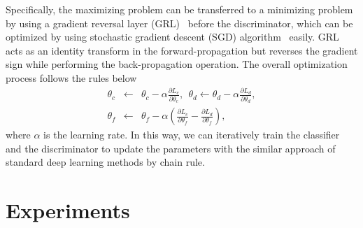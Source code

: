\documentclass[journal]{IEEEtran}
\begin{document}
Specifically, the maximizing problem can be transferred to a minimizing problem by using a gradient reversal layer (GRL)~\cite{ganin2016domain} before the discriminator, which can be optimized by using stochastic gradient
descent (SGD) algorithm~\cite{bottou2010large} easily. GRL acts as an identity transform in the forward-propagation but reverses the gradient sign while performing the back-propagation operation. The overall optimization process follows the rules below
\begin{eqnarray}
\theta_c \!\!\!\!&\leftarrow&\!\!\!\! \theta_c - \alpha \frac{\partial{L_c}}{\partial{\theta_c}},~~
\theta_d \leftarrow \theta_d - \alpha \frac{\partial{L_d}}{\partial{\theta_d}},  \\
\theta_f \!\!\!\!&\leftarrow&\!\!\!\! \theta_f - \alpha (\frac{\partial{L_c}}{\partial{\theta_f}} - \frac{\partial{L_d}}{\partial{\theta_f}}),
\end{eqnarray}
where $\alpha$ is the learning rate. In this way, we can iteratively train the classifier and the discriminator to update the parameters with the similar approach of standard deep learning methods by chain rule.


\section{Experiments}
\label{Sec: Experiment}
\end{document}
